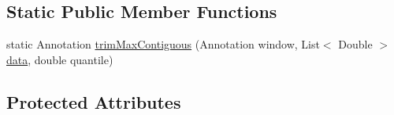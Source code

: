 \subsection*{Static Public Member Functions}
\begin{DoxyCompactItemize}
\item 
static Annotation \hyperlink{classbroad_1_1pda_1_1seq_1_1protection_1_1_sample_data_a8d27ed6393a7f774100c706c5a1b9b8d}{trim\+Max\+Contiguous} (Annotation window, List$<$ Double $>$ \hyperlink{classbroad_1_1pda_1_1seq_1_1protection_1_1_sample_data_ae06d8e63d6ddf7093085beba12b22e8a}{data}, double quantile)
\end{DoxyCompactItemize}
\subsection*{Protected Attributes}
